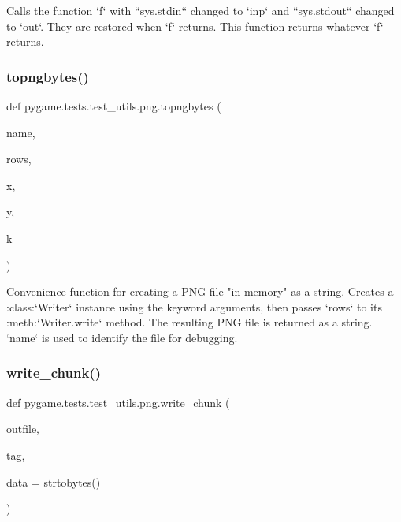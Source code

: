 \begin{DoxyVerb}Calls the function `f` with ``sys.stdin`` changed to `inp`
and ``sys.stdout`` changed to `out`.  They are restored when `f`
returns.  This function returns whatever `f` returns.
\end{DoxyVerb}
 \mbox{\label{namespacepygame_1_1tests_1_1test__utils_1_1png_a7955600fa57fd46e32846c5792595a12}} 
\subsubsection{\texorpdfstring{topngbytes()}{topngbytes()}}
{\footnotesize\ttfamily def pygame.\+tests.\+test\+\_\+utils.\+png.\+topngbytes (\begin{DoxyParamCaption}\item[{}]{name,  }\item[{}]{rows,  }\item[{}]{x,  }\item[{}]{y,  }\item[{}]{k }\end{DoxyParamCaption})}

\begin{DoxyVerb}Convenience function for creating a PNG file "in memory" as a
string.  Creates a :class:`Writer` instance using the keyword arguments,
then passes `rows` to its :meth:`Writer.write` method.  The resulting
PNG file is returned as a string.  `name` is used to identify the file for
debugging.
\end{DoxyVerb}
 \mbox{\label{namespacepygame_1_1tests_1_1test__utils_1_1png_a2f029ba4e9282e48376f1dede0ee21d1}} 
\subsubsection{\texorpdfstring{write\+\_\+chunk()}{write\_chunk()}}
{\footnotesize\ttfamily def pygame.\+tests.\+test\+\_\+utils.\+png.\+write\+\_\+chunk (\begin{DoxyParamCaption}\item[{}]{outfile,  }\item[{}]{tag,  }\item[{}]{data = {\ttfamily strtobytes(\textquotesingle{}\textquotesingle{})} }\end{DoxyParamCaption})}

